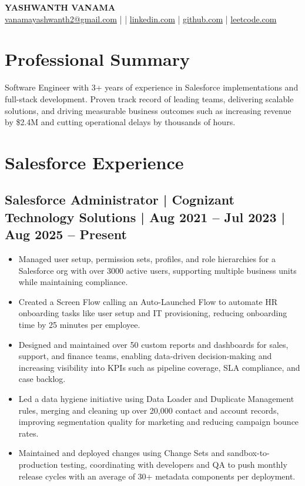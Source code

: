 \documentclass[a4paper,11pt]{article}
\begin{document}
\pagestyle{empty}

\begin{center}
    {\Huge \textbf{YASHWANTH VANAMA}} \\
    \vspace{4pt}
    \href{mailto:vanamayashwanth2@gmail.com}{vanamayashwanth2@gmail.com} \quad |  \quad | \quad
    \href{https://linkedin.com/in/yashwanth-vanama-873a75127/}{linkedin.com} \quad | \quad
    \href{https://github.com/yashwanthvanama}{github.com} \quad | \quad
    \href{https://leetcode.com/u/yashwanthvanama/}{leetcode.com}
\end{center}

\vspace{2pt}

\section*{Professional Summary}
Software Engineer with 3+ years of experience in Salesforce implementations and full-stack development. Proven track record of leading teams, delivering scalable solutions, and driving measurable business outcomes such as increasing revenue by \$2.4M and cutting operational delays by thousands of hours.

\section*{Salesforce Experience}

\subsection{Salesforce Administrator | Cognizant Technology Solutions | Aug 2021 – Jul 2023 | Aug 2025 – Present}
\begin{itemize}
    \item Managed user setup, permission sets, profiles, and role hierarchies for a Salesforce org with over 3000 active users, supporting multiple business units while maintaining compliance.
    \item Created a Screen Flow calling an Auto-Launched Flow to automate HR onboarding tasks like user setup and IT provisioning, reducing onboarding time by 25 minutes per employee.
    \item Designed and maintained over 50 custom reports and dashboards for sales, support, and finance teams, enabling data-driven decision-making and increasing visibility into KPIs such as pipeline coverage, SLA compliance, and case backlog.
    \item Led a data hygiene initiative using Data Loader and Duplicate Management rules, merging and cleaning up over 20,000 contact and account records, improving segmentation quality for marketing and reducing campaign bounce rates.
    \item Maintained and deployed changes using Change Sets and sandbox-to-production testing, coordinating with developers and QA to push monthly release cycles with an average of 30+ metadata components per deployment.
\end{itemize}
\end{document}

